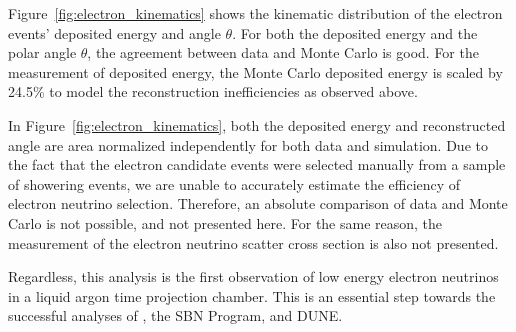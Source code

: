 Figure~\ref{fig:electron_kinematics} shows the kinematic distribution of the electron events' deposited energy and angle $\theta$.  For both the deposited energy and the polar angle $\theta$, the agreement between data and Monte Carlo is good.  For the measurement of deposited energy, the Monte Carlo deposited energy is scaled by 24.5\% to model the reconstruction inefficiencies as observed above.

In Figure~\ref{fig:electron_kinematics}, both the deposited energy and reconstructed angle are area normalized independently for both data and simulation.  Due to the fact that the electron candidate events were selected manually from a sample of showering events, we are unable to accurately estimate the efficiency of electron neutrino selection.  Therefore, an absolute comparison of data and Monte Carlo is not possible, and not presented here.  For the same reason, the measurement of the electron neutrino scatter cross section is also not presented.

Regardless, this analysis is the first observation of low energy electron neutrinos in a liquid argon time projection chamber.  This is an essential step towards the successful analyses of \uboone, the SBN Program, and DUNE.


